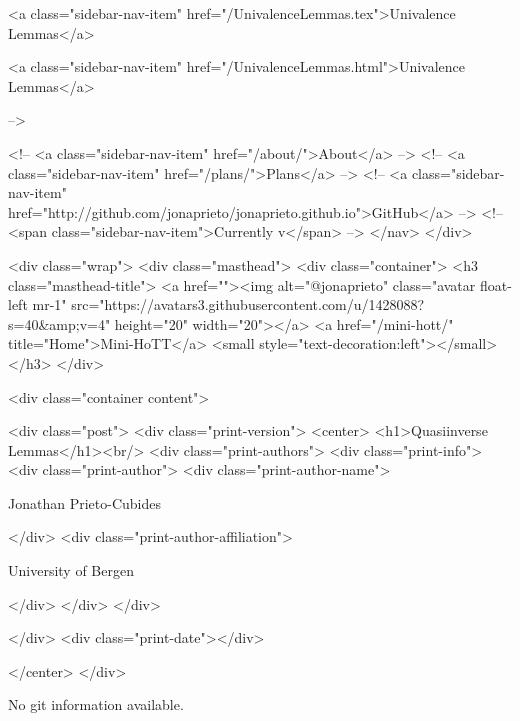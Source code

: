       
    
      
        
          <a class="sidebar-nav-item" href="/UnivalenceLemmas.tex">Univalence Lemmas</a>
        
      
    
      
        
          <a class="sidebar-nav-item" href="/UnivalenceLemmas.html">Univalence Lemmas</a>
        
      
     -->

    <!-- <a class="sidebar-nav-item" href="/about/">About</a> -->
    <!-- <a class="sidebar-nav-item" href="/plans/">Plans</a> -->
    <!-- <a class="sidebar-nav-item" href="http://github.com/jonaprieto/jonaprieto.github.io">GitHub</a> -->
    <!-- <span class="sidebar-nav-item">Currently v</span> -->
  </nav>
</div>

    <div class="wrap">
      <div class="masthead">
        <div class="container">
          <h3 class="masthead-title">
            <a href=""><img alt="@jonaprieto" class="avatar float-left mr-1" src="https://avatars3.githubusercontent.com/u/1428088?s=40&amp;v=4" height="20" width="20"></a>
            <a href="/mini-hott/" title="Home">Mini-HoTT</a>
            <small style="text-decoration:left"></small>
          </h3>
        </div>
      
      <div class="container content">
        







<div class="post">
  <div class="print-version">
    <center>
      <h1>Quasiinverse Lemmas</h1><br/>
        <div class="print-authors">
          <div class="print-info">
            <div class="print-author">
              <div class="print-author-name">
                
                  Jonathan Prieto-Cubides
                
              </div>
              <div class="print-author-affiliation">
                
                  University of Bergen
                
                </div>
            </div>
          </div>
          
          
        </div>
        <div class="print-date"></div>
        
        
    </center>
  </div>

  
  No git information available.
  

